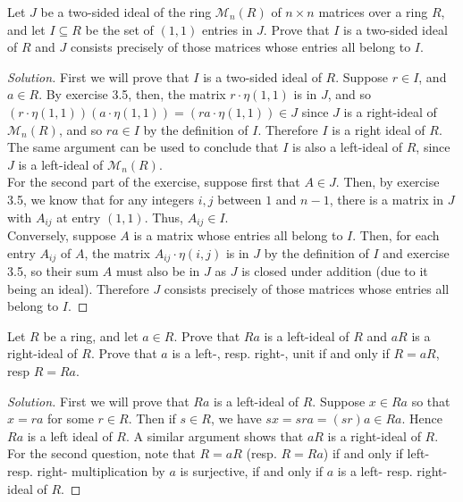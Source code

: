 \documentclass[12pt]{article}
\newenvironment{problem}[2][Problem]{\begin{trivlist}
\item[\hskip \labelsep {\bfseries #1}\hskip \labelsep {\bfseries #2.}]}{\end{trivlist}}
\newenvironment{solution}
  {\renewcommand\qedsymbol{$\blacksquare$}\begin{proof}[Solution]}
{\end{proof}}
\theoremstyle{remark}
\begin{document}
\begin{problem}{3.6}
  Let $J$ be a two-sided ideal of the ring $\mathcal{M}_n(R)$ of $n\times n$ matrices over a ring $R$,
  and let $I\subseteq R$ be the set of $(1,1)$ entries in $J$.
  Prove that $I$ is a two-sided ideal of $R$ and $J$ consists precisely of those matrices whose
  entries all belong to $I$.
\end{problem}
\begin{solution}
  First we will prove that $I$ is a two-sided ideal of $R$.
  Suppose $r\in I$, and $a\in R$.
  By exercise 3.5, then, the matrix $r\cdot\eta(1,1)$ is in $J$, and so 
  $(r\cdot\eta(1,1))(a\cdot\eta(1,1))=(ra\cdot\eta(1,1))\in J$ since $J$ is a right-ideal of
  $\mathcal{M}_n(R)$, and so $ra\in I$ by the definition of $I$.
  Therefore $I$ is a right ideal of $R$.
  The same argument can be used to conclude that $I$ is also a left-ideal of $R$,
  since $J$ is a left-ideal of $\mathcal{M}_n(R)$. \\
  \indent For the second part of the exercise, suppose first that $A\in J$.
  Then, by exercise 3.5, we know that for any integers $i,j$ between $1$ and $n-1$,
  there is a matrix in $J$ with $A_{ij}$ at entry $(1,1)$.
  Thus, $A_{ij}\in I$. \\
  \indent Conversely, suppose $A$ is a matrix whose entries all belong to $I$.
  Then, for each entry $A_{ij}$ of $A$, the matrix $A_{ij}\cdot\eta(i,j)$ is in $J$ by
  the definition of $I$ and exercise 3.5, so their sum $A$ must also be in $J$ as $J$
  is closed under addition (due to it being an ideal).
  Therefore $J$ consists precisely of those matrices whose entries all belong to $I$.
\end{solution}

\begin{problem}{3.7}
  Let $R$ be a ring, and let $a\in R$.
  Prove that $Ra$ is a left-ideal of $R$ and $aR$ is a right-ideal of $R$.
  Prove that $a$ is a left-, resp. right-, unit if and only if $R=aR$, resp $R=Ra$.
\end{problem}
\begin{solution}
  First we will prove that $Ra$ is a left-ideal of $R$.
  Suppose $x\in Ra$ so that $x=ra$ for some $r\in R$.
  Then if $s\in R$, we have $sx=sra=(sr)a\in Ra$.
  Hence $Ra$ is a left ideal of $R$.
  A similar argument shows that $aR$ is a right-ideal of $R$. \\
  \indent For the second question, note that $R=aR$ (resp. $R=Ra$) if and only
  if left- resp. right- multiplication by $a$ is surjective, if and only if
  $a$ is a left- resp. right- ideal of $R$.
\end{solution}
\end{document}

